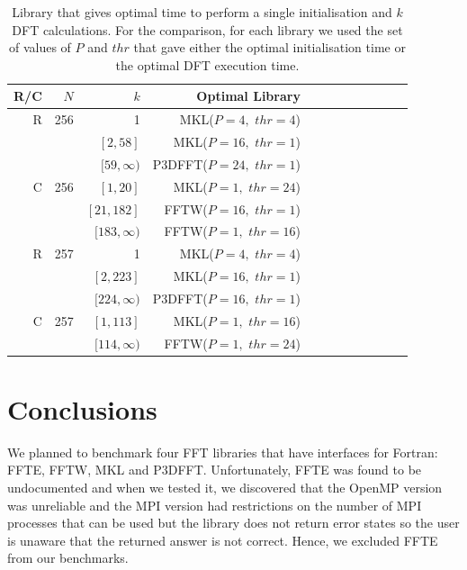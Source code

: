 \documentclass[a4paper]{article}
\begin{document}
 \begin{table}[!htbp]
\begin{center}
\begin{tabular}{|r|r|r|r|r|r||r|r|r|r|r|r|}\hline
R/C & $N$ & $k$ & Optimal Library \\ \hline
R & 256 & 1 & MKL($P=4,$ $thr=4$) \\
  &     & $[2,58]$ & MKL($P=16,$ $thr=1$) \\
  &     & $[59,\infty)$ & P3DFFT($P=24,$ $thr=1$) \\\hline
C & 256 & $[1,20]$ & MKL($P=1,$ $thr=24$) \\
  &     & $[21,182]$ & FFTW($P=16,$ $thr=1$) \\
  &     & $[183,\infty)$ & FFTW($P=1,$ $thr=16$) \\\hline
R & 257 & 1 & MKL($P=4,$ $thr=4$) \\
  &     & $[2,223]$ & MKL($P=16,$ $thr=1$) \\
  &     & $[224,\infty)$ & P3DFFT($P=16,$ $thr=1$) \\\hline
C & 257 & $[1,113]$ & MKL($P=1,$ $thr=16$) \\
  &     & $[114,\infty)$ & FFTW($P=1,$ $thr=24$) \\\hline
\end{tabular}
\caption{ Library that gives optimal time to perform a single initialisation and $k$ DFT calculations. For the comparison, for each library we used the set of values of $P$ and $thr$ that gave either the optimal initialisation time or the optimal DFT execution time.  }\label{Tbl3DCompk}
\end{center}
\end{table}

 

\section{Conclusions}\label{Sec:Conclusions}

We planned to benchmark four FFT libraries that have interfaces for
Fortran: FFTE, FFTW, MKL and P3DFFT. Unfortunately, FFTE was found to
be undocumented and when we tested it, we discovered that the OpenMP
version was unreliable and the MPI version had restrictions on the
number of MPI processes that can be used but the library does not
return error states so the user is unaware that the returned answer is
not correct. Hence, we excluded FFTE from our benchmarks.
\end{document}
